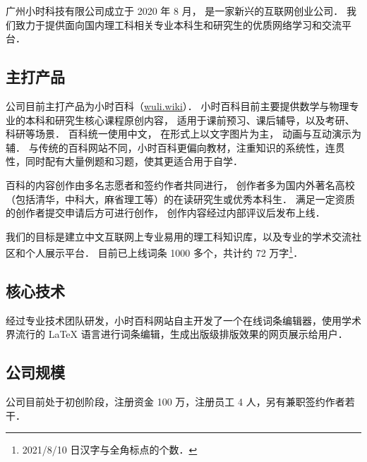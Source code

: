 
广州小时科技有限公司成立于 2020 年 8 月， 是一家新兴的互联网创业公司． 我们致力于提供面向国内理工科相关专业本科生和研究生的优质网络学习和交流平台．

\subsection{主打产品}
公司目前主打产品为小时百科（\href{https://wuli.wiki}{wuli.wiki}）． 小时百科目前主要提供数学与物理专业的本科和研究生核心课程原创内容， 适用于课前预习、课后辅导，以及考研、科研等场景． 百科统一使用中文， 在形式上以文字图片为主， 动画与互动演示为辅． 与传统的百科网站不同，小时百科更偏向教材，注重知识的系统性，连贯性，同时配有大量例题和习题，使其更适合用于自学．

百科的内容创作由多名志愿者和签约作者共同进行， 创作者多为国内外著名高校（包括清华，中科大，麻省理工等）的在读研究生或优秀本科生． 满足一定资质的创作者提交申请后方可进行创作， 创作内容经过内部评议后发布上线．

我们的目标是建立中文互联网上专业易用的理工科知识库，以及专业的学术交流社区和个人展示平台． 目前已上线词条 1000 多个，共计约 72 万字\footnote{2021/8/10 日汉字与全角标点的个数．}．

\subsection{核心技术}
经过专业技术团队研发，小时百科网站自主开发了一个在线词条编辑器，使用学术界流行的 LaTeX 语言进行词条编辑，生成出版级排版效果的网页展示给用户．

\subsection{公司规模}
公司目前处于初创阶段，注册资金 100 万，注册员工 4 人，另有兼职签约作者若干．
